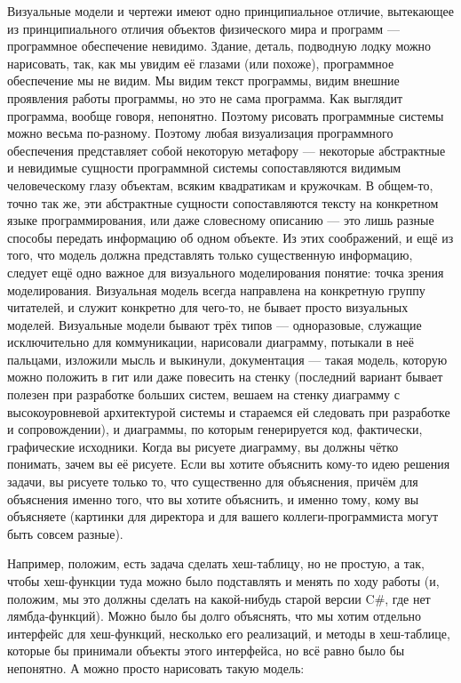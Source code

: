 \documentclass{../../text-style}
\begin{document}
Визуальные модели и чертежи имеют одно принципиальное отличие, вытекающее из принципиального отличия объектов физического мира и программ --- программное обеспечение невидимо. Здание, деталь, подводную лодку можно нарисовать, так, как мы увидим её глазами (или похоже), программное обеспечение мы не видим. Мы видим текст программы, видим внешние проявления работы программы, но это не сама программа. Как выглядит программа, вообще говоря, непонятно. Поэтому рисовать программные системы можно весьма по-разному. Поэтому любая визуализация программного обеспечения представляет собой некоторую метафору --- некоторые абстрактные и невидимые сущности программной системы сопоставляются видимым человеческому глазу объектам, всяким квадратикам и кружочкам. В общем-то, точно так же, эти абстрактные сущности сопоставляются тексту на конкретном языке программирования, или даже словесному описанию --- это лишь разные способы передать информацию об одном объекте. Из этих соображений, и ещё из того, что модель должна представлять только существенную информацию, следует ещё одно важное для визуального моделирования понятие: точка зрения моделирования. Визуальная модель всегда направлена на конкретную группу читателей, и служит конкретно для чего-то, не бывает просто визуальных моделей. Визуальные модели бывают трёх типов --- одноразовые, служащие исключительно для коммуникации, нарисовали диаграмму, потыкали в неё пальцами, изложили мысль и выкинули, документация --- такая модель, которую можно положить в гит или даже повесить на стенку (последний вариант бывает полезен при разработке больших систем, вешаем на стенку диаграмму с высокоуровневой архитектурой системы и стараемся ей следовать при разработке и сопровождении), и диаграммы, по которым генерируется код, фактически, графические исходники. Когда вы рисуете диаграмму, вы должны чётко понимать, зачем вы её рисуете. Если вы хотите объяснить кому-то идею решения задачи, вы рисуете только то, что существенно для объяснения, причём для объяснения именно того, что вы хотите объяснить, и именно тому, кому вы объясняете (картинки для директора и для вашего коллеги-программиста могут быть совсем разные).

Например, положим, есть задача сделать хеш-таблицу, но не простую, а так, чтобы хеш-функции туда можно было подставлять и менять по ходу работы (и, положим, мы это должны сделать на какой-нибудь старой версии C\#, где нет лямбда-функций). Можно было бы долго объяснять, что мы хотим отдельно интерфейс для хеш-функций, несколько его реализаций, и методы в хеш-таблице, которые бы принимали объекты этого интерфейса, но всё равно было бы непонятно. А можно просто нарисовать такую модель:
\end{document}
